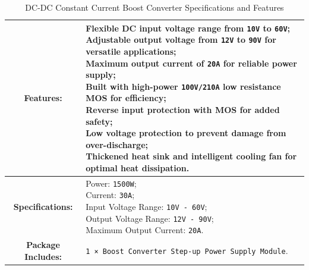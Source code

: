 \documentclass[../../main]{subfiles}
\begin{document}
\begin{table}[h!]
    \centering
    \begin{tabular}{|c|p{11cm}|} %
        \hline
        \textbf{Features:} & 
        \parbox{11cm}{\centering
        \vspace{5pt}
            Flexible DC input voltage range from \texttt{10V} to \texttt{60V}; \\
            Adjustable output voltage from \texttt{12V} to \texttt{90V} for versatile applications; \\
            Maximum output current of \texttt{20A} for reliable power supply; \\
            Built with high-power \texttt{100V/210A} low resistance MOS for efficiency; \\
            Reverse input protection with MOS for added safety; \\
            Low voltage protection to prevent damage from over-discharge; \\
            Thickened heat sink and intelligent cooling fan for optimal heat dissipation.
            \vspace{5pt}} \\ \hline
        
        \textbf{Specifications:} & 
        \parbox{10cm}{\centering \vspace{5pt}
            Power: \texttt{1500W}; \\
            Current: \texttt{30A}; \\
            Input Voltage Range: \texttt{10V - 60V}; \\
            Output Voltage Range: \texttt{12V - 90V}; \\
            Maximum Output Current: \texttt{20A}. \vspace{5pt}
        } \\ \hline
        
        \textbf{Package Includes:} & 
        \parbox{10cm}{\centering \vspace{5pt}
            \texttt{1 × Boost Converter Step-up Power Supply Module}.
            \vspace{5pt}} \\ \hline
    \end{tabular}
    \caption{DC-DC Constant Current Boost Converter Specifications and Features}
    \label{tab:boost-converter-specs} %
\end{table}
    
\end{document}
